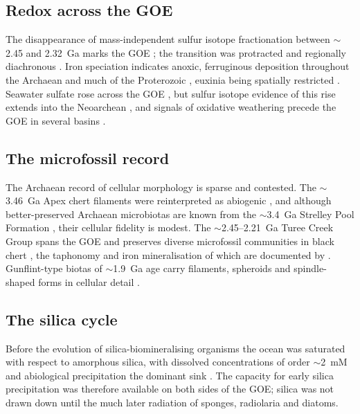 \documentclass[11pt]{article}
\begin{document}
\subsection{Redox across the GOE}

The disappearance of mass-independent sulfur isotope fractionation between $\sim$2.45 and 2.32~Ga
marks the GOE \citep{Holland2006,Bekker2004,Pavlov2002,Farquhar2000}; the transition was protracted
and regionally diachronous \citep{Lyons2014,Philippot2018}. Iron speciation indicates anoxic,
ferruginous deposition throughout the Archaean and much of the Proterozoic
\citep{Canfield1998,Poulton2005,Poulton2011}, euxinia being spatially restricted
\citep{Reinhard2009}. Seawater sulfate rose across the GOE \citep{Habicht2002,Kah2004,Crowe2014},
but sulfur isotope evidence of this rise extends into the Neoarchean \citep{Reinhard2009}, and
signals of oxidative weathering precede the GOE in several basins \citep{Anbar2007}.

\subsection{The microfossil record}

The Archaean record of cellular morphology is sparse and contested. The $\sim$3.46~Ga Apex chert
filaments \citep{Schopf1993} were reinterpreted as abiogenic \citep{Brasier2002}, and although
better-preserved Archaean microbiotas are known from the $\sim$3.4~Ga Strelley Pool Formation
\citep{Sugitani2010,Delarue2020}, their cellular fidelity is modest. The $\sim$2.45--2.21~Ga Turee
Creek Group spans the GOE and preserves diverse microfossil communities in black chert
\citep{Barlow2018}, the taphonomy and iron mineralisation of which are documented by
\citet{Lepot2017b}. Gunflint-type biotas of $\sim$1.9~Ga age carry filaments, spheroids and
spindle-shaped forms in cellular detail \citep{Lepot2017a,Javaux2018}.

\subsection{The silica cycle}

Before the evolution of silica-biomineralising organisms the ocean was saturated with respect to
amorphous silica, with dissolved concentrations of order $\sim$2~mM and abiological precipitation
the dominant sink \citep{Siever1992,Perry2007}. The capacity for early silica precipitation was
therefore available on both sides of the GOE; silica was not drawn down until the much later
radiation of sponges, radiolaria and diatoms.
\end{document}
